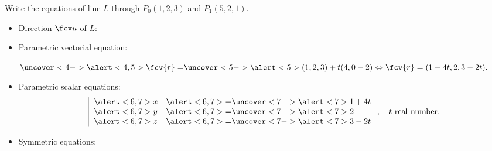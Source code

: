 \begin{frame}
\begin{example}

Write the equations of line $L$ through $P_0(1,2,3)$ and $P_1(5,2,1)$.

\begin{itemize}
\item<2-> Direction $\fcv u$ of $L$: 
\item<4-> Parametric vectorial equation:

$  \uncover<4->{\alert<4,5>{\fcv{r}=}} \uncover<5->{
\alert<5>{
( 1,2,3) + t ( 4, 0 -2) \Leftrightarrow  \fcv{r} = ( 1+4t, 2, 3-2t)
} .}
$
\item<6-> Parametric scalar equations:
\[\left|
\begin{array}{ll}
\alert<6,7>{x} & \alert<6,7>{=}\uncover<7->{\alert<7>{ 1+4t}} \\
\alert<6,7>{y} & \alert<6,7>{=}\uncover<7->{\alert<7>{ 2 }}\\
\alert<6,7>{z} & \alert<6,7>{=}\uncover<7->{\alert<7>{ 3-2t}}
\end{array}
\right. , \quad t \text{ real number.}\]
%
\item<8-> \alert<8>{Symmetric equations:}
\end{itemize}
\end{example}
\end{frame}
